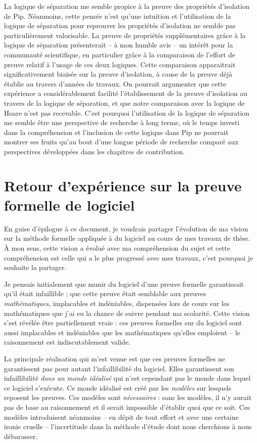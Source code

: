 		La logique de séparation me semble propice à la preuve des propriétés d'isolation de Pip. Néanmoins, cette pensée n'est qu'une intuition et l'utilisation de la logique de séparation pour reprouver les propriétés d'isolation ne semble pas particulièrement valorisable. La preuve de propriétés supplémentaires grâce à la logique de séparation présenterait -- à mon humble avis -- un intérêt pour la communauté scientifique, en particulier grâce à la comparaison de l'effort de preuve relatif à l'usage de ces deux logiques. Cette comparaison apparaitrait significativement biaisée sur la preuve d'isolation, à cause de la preuve déjà établie au travers d'années de travaux. On pourrait argumenter que cette expérience a considérablement facilité l'établissement de la preuve d'isolation au travers de la logique de séparation, et que notre comparaison avec la logique de Hoare n'est pas recevable. C'est pourquoi l'utilisation de la logique de séparation me semble être une perspective de recherche à long terme, où le temps investi dans la compréhension et l'inclusion de cette logique dans Pip ne pourrait montrer ses fruits qu'au bout d'une longue période de recherche comparé aux perspectives développées dans les chapitres de contribution.

		\section{Retour d'expérience sur la preuve formelle de logiciel}

		En guise d'épilogue à ce document, je voudrais partager l'évolution de ma vision sur la méthode formelle appliquée à du logiciel au cours de mes travaux de thèse. À mon sens, cette vision a évolué avec ma compréhension du sujet et cette compréhension est celle qui a le plus progressé avec mes travaux, c'est pourquoi je souhaite la partager.

		Je pensais initialement que munir du logiciel d'une preuve formelle garantissait qu'il était infaillible ; que cette preuve était semblable aux preuves \emph{mathématiques}, implacables et indéniables, dispensées lors de cours sur les mathématiques que j'ai eu la chance de suivre pendant ma scolarité. Cette vision s'est révélée être partiellement vraie : ces preuves formelles sur du logiciel sont aussi implacables et indéniables que les mathématiques qu'elles emploient -- le raisonnement est indiscutablement valide.

		La principale réalisation qui m'est venue est que ces preuves formelles ne garantissent pas pour autant l'infaillibilité du logiciel. Elles garantissent son infaillibilité \emph{dans un monde idéalisé} qui n'est cependant pas le monde dans lequel ce logiciel s'exécute. Ce monde idéalisé est créé par les \emph{modèles} sur lesquels reposent les preuves. Ces modèles sont \emph{nécessaires} : sans les modèles, il n'y aurait pas de base au raisonnement et il serait impossible d'établir quoi que ce soit. Ces modèles introduisent néanmoins -- en dépit de tout effort et avec une certaine ironie cruelle -- l'incertitude dans la méthode d'étude dont nous cherchions à nous débarasser. 

